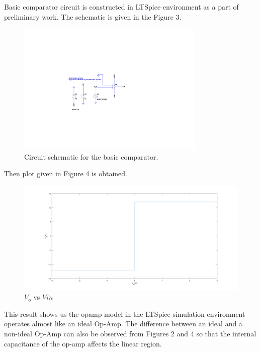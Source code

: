 \documentclass[letterpaper,12pt]{article}
\begin{document}
Basic comparator circuit is constructed in LTSpice environment as a part of preliminary work. The schematic is given in the Figure 3.
\begin{figure}[H]
	\centering
   \includegraphics[width=0.8\textwidth]{BasicComparator_SCH.pdf}
   \caption{Circuit schematic for the basic comparator.}
\end{figure} 
Then plot given in Figure 4 is obtained.

\begin{figure}[H]
	\centering
   \includegraphics[width=1\textwidth]{3a_vs_vin.png}
   \caption{\(V_o\) vs \(V{in}\)}
\end{figure}
This result shows us the opamp model in the LTSpice simulation environment operates almost like an ideal Op-Amp. The difference between an ideal and a non-ideal Op-Amp can also be observed from Figures 2  and 4 so that the internal capacitance of the op-amp affects the linear region.
\end{document}
